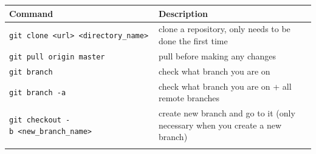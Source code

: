 \documentclass[]{book}
\begin{document}
\begin{longtable}[]{@{}ll@{}}
\toprule
\begin{minipage}[b]{0.34\columnwidth}\raggedright
Command\strut
\end{minipage} & \begin{minipage}[b]{0.60\columnwidth}\raggedright
Description\strut
\end{minipage}\tabularnewline
\midrule
\endhead
\begin{minipage}[t]{0.34\columnwidth}\raggedright
\texttt{git\ clone\ \textless{}url\textgreater{}\ \textless{}directory\_name\textgreater{}}\strut
\end{minipage} & \begin{minipage}[t]{0.60\columnwidth}\raggedright
clone a repository, only needs to be done the first time\strut
\end{minipage}\tabularnewline
\begin{minipage}[t]{0.34\columnwidth}\raggedright
\texttt{git\ pull\ origin\ master}\strut
\end{minipage} & \begin{minipage}[t]{0.60\columnwidth}\raggedright
pull before making any changes\strut
\end{minipage}\tabularnewline
\begin{minipage}[t]{0.34\columnwidth}\raggedright
\texttt{git\ branch}\strut
\end{minipage} & \begin{minipage}[t]{0.60\columnwidth}\raggedright
check what branch you are on\strut
\end{minipage}\tabularnewline
\begin{minipage}[t]{0.34\columnwidth}\raggedright
\texttt{git\ branch\ -a}\strut
\end{minipage} & \begin{minipage}[t]{0.60\columnwidth}\raggedright
check what branch you are on + all remote branches\strut
\end{minipage}\tabularnewline
\begin{minipage}[t]{0.34\columnwidth}\raggedright
\texttt{git\ checkout\ -b\ \textless{}new\_branch\_name\textgreater{}}\strut
\end{minipage} & \begin{minipage}[t]{0.60\columnwidth}\raggedright
create new branch and go to it (only necessary when you create a new branch)\strut
\end{minipage}\tabularnewline
\begin{minipage}[t]{0.34\columnwidth}\raggedright

\end{minipage}
\end{longtable}
\end{document}

